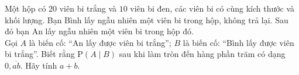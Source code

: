 \begin{vd}%
	Một hộp có $20$ viên bi trắng và $10$ viên bi đen, các viên bi có cùng kích thước và khối lượng. Bạn Bình lấy ngẫu nhiên một viên bi trong hộp, không trả lại. Sau đó bạn An lấy ngẫu nhiên một viên bi trong hộp đó.\\
	Gọi $A$ là biến cố: ``An lấy được viên bi trắng''; $B$ là biến cố: ``Bình lấy được viên bi trắng''. Biết rằng $\mathrm{P}(A\mid B)$ sau khi làm tròn đến hàng phần trăm có dạng $0{,}\overline{ab}$. Hãy tính $a+b$.
\end{vd}

